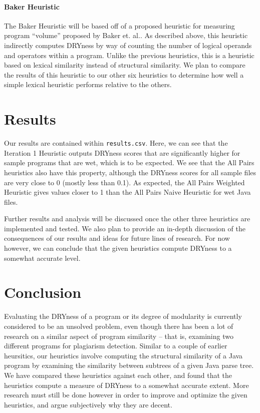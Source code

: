 \documentclass{article}
\begin{document}
\paragraph{Baker Heuristic}

The Baker Heuristic will be based off of a proposed heuristic for measuring program ``volume'' proposed
by Baker et. al.\cite{Modularity1979}. As described above, this heuristic indirectly computes DRYness by way of counting the
number of logical operands and operators within a program. Unlike the previous heuristics, this is a heuristic based on
lexical similarity instead of structural similarity. We plan to compare the results of this heuristic to our other six
heuristics to determine how well a simple lexical heuristic performs relative to the others.

\section{Results}

Our results are contained within \texttt{results.csv}. Here, we can see that the Iteration 1 Heuristic outputs DRYness scores
that are significantly higher for sample programs that are wet, which is to be expected. We see that the All Pairs
heuristics also have this property, although the DRYness scores for all sample files are very close to 0 (mostly less than 0.1).
As expected, the All Pairs Weighted Heuristic gives values closer to 1 than the All Pairs Naive Heuristic for wet Java files.

Further results and analysis will be discussed once the other three heuristics are implemented and tested. We also plan to
provide an in-depth discussion of the consequences of our results and ideas for future lines of research. For now however,
we can conclude that the given heuristics compute DRYness to a somewhat accurate level.

\section{Conclusion}

Evaluating the DRYness of a program or its degree of modularity is currently considered to be an unsolved problem,
even though there has been a lot of research on a similar aspect of program similarity -- that is, examining two
different programs for plagiarism detection. Similar to a couple of earlier heursitics, our heuristics involve
computing the structural similarity of a Java program by examining the similarity between subtrees of a given Java parse tree. 
We have compared these heuristics against each other, and found that the heuristics compute a measure of DRYness to a 
somewhat accurate extent. More research must still be done however in order to
improve and optimize the given heuristics, and argue subjectively why they are decent.
\end{document}
